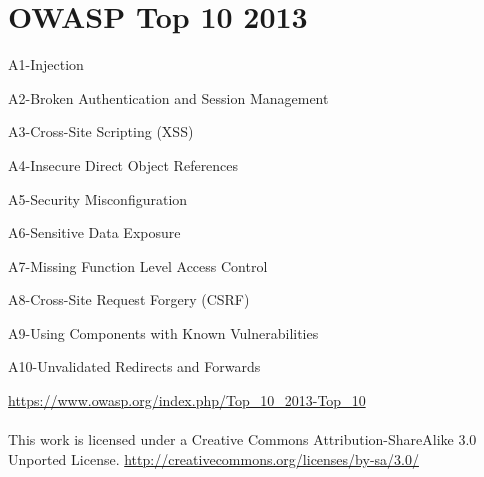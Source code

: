 \section{OWASP Top 10 2013}
\begin{description}
\item A1-Injection
\item A2-Broken Authentication and Session Management
\item A3-Cross-Site Scripting (XSS)
\item A4-Insecure Direct Object References
\item A5-Security Misconfiguration
\item A6-Sensitive Data Exposure
\item A7-Missing Function Level Access Control
\item A8-Cross-Site Request Forgery (CSRF)
\item A9-Using Components with Known Vulnerabilities
\item A10-Unvalidated Redirects and Forwards
\end{description}
\url{https://www.owasp.org/index.php/Top_10_2013-Top_10}\\\\This work is licensed under a Creative Commons Attribution-ShareAlike 3.0 Unported License. \url{http://creativecommons.org/licenses/by-sa/3.0/}
